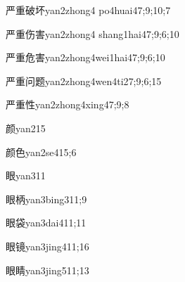 \begin{verbete}{严重破坏}{yan2zhong4 po4huai4}{7;9;10;7}
\end{verbete}

\begin{verbete}{严重伤害}{yan2zhong4 shang1hai4}{7;9;6;10}
\end{verbete}

\begin{verbete}{严重危害}{yan2zhong4wei1hai4}{7;9;6;10}
\end{verbete}

\begin{verbete}{严重问题}{yan2zhong4wen4ti2}{7;9;6;15}
\end{verbete}

\begin{verbete}{严重性}{yan2zhong4xing4}{7;9;8}
\end{verbete}

\begin{verbete}{颜}{yan2}{15}
\end{verbete}

\begin{verbete}{颜色}{yan2se4}{15;6}
\end{verbete}

\begin{verbete}{眼}{yan3}{11}
\end{verbete}

\begin{verbete}{眼柄}{yan3bing3}{11;9}
\end{verbete}

\begin{verbete}{眼袋}{yan3dai4}{11;11}
\end{verbete}

\begin{verbete}{眼镜}{yan3jing4}{11;16}
\end{verbete}

\begin{verbete}{眼睛}{yan3jing5}{11;13}
\end{verbete}

